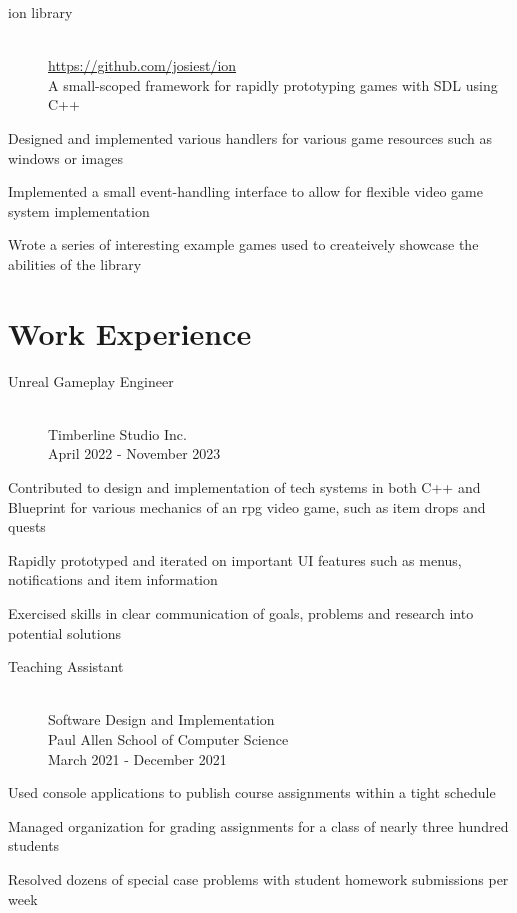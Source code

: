 \documentclass[10pt]{article}
\newenvironment{itemize*}
{\begin{itemize}[leftmargin=*]
    \setlength{\parskip}{0.5pt}}
{\end{itemize}}
\begin{document}
\begin{paracol}{2}
\begin{description}
\item[ion library] \hfill \\
    \url{https://github.com/josiest/ion}\\
    A small-scoped framework for rapidly prototyping games with SDL using C++
\end{description}
\begin{itemize*}
\item Designed and implemented various handlers for various game resources such
      as windows or images
\item Implemented a small event-handling interface to allow for flexible
      video game system implementation
\item Wrote a series of interesting example games used to createively showcase
      the abilities of the library
\end{itemize*}

\switchcolumn
\section*{Work Experience}

\begin{description}
\item[Unreal Gameplay Engineer] \hfill \\
    Timberline Studio Inc. \\
    April 2022 - November 2023
\end{description}
\begin{itemize*}
\item Contributed to design and implementation of tech systems in both C++ and Blueprint for various mechanics of an rpg video game, such as item drops and quests
\item Rapidly prototyped and iterated on important UI features such as menus, notifications and item information
\item Exercised skills in clear communication of goals, problems and research into potential solutions
\end{itemize*}


\begin{description}
\item[Teaching Assistant] \hfill \\
    Software Design and Implementation \\
    Paul Allen School of Computer Science \\
    March 2021 - December 2021
\end{description}
\begin{itemize*}
\item Used console applications to publish course assignments within a tight schedule
\item Managed organization for grading assignments for a class of nearly three
      hundred students
\item Resolved dozens of special case problems with student homework
      submissions per week
\end{itemize*}


\end{paracol}
\end{document}
